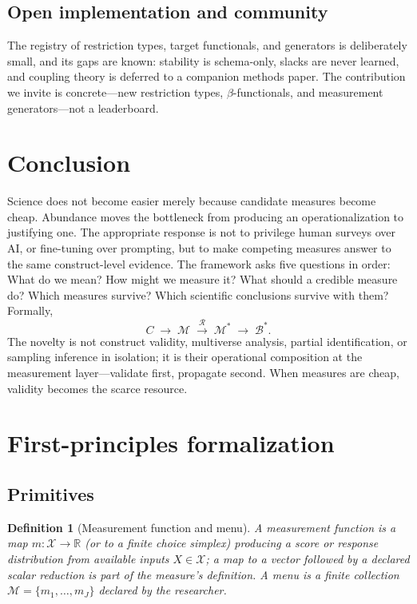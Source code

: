 \documentclass[10pt,letterpaper]{article}
\newtheorem{definition}{Definition}[section]
\newcommand{\M}{\ensuremath{\mathcal{M}}}
\newcommand{\Rset}{\mathcal{R}}
\newcommand{\Bset}{\mathcal{B}}
\begin{document}
\subsection{Open implementation and community}
The registry of restriction types, target functionals, and generators is deliberately small, and its gaps are known: stability is schema-only, slacks are never learned, and coupling theory is deferred to a companion methods paper.
The contribution we invite is concrete---new restriction types, $\beta$-functionals, and measurement generators---not a leaderboard.

\section{Conclusion}
\label{sec:conclusion}

Science does not become easier merely because candidate measures become cheap.
Abundance moves the bottleneck from producing an operationalization to justifying one.
The appropriate response is not to privilege human surveys over AI, or fine-tuning over prompting, but to make competing measures answer to the same construct-level evidence.
The framework asks five questions in order: What do we mean?
How might we measure it?
What should a credible measure do?
Which measures survive?
Which scientific conclusions survive with them?
Formally,
\[
C\;\longrightarrow\;\M\;\xrightarrow{\;\Rset\;}\;\M^*\;\longrightarrow\;\Bset^*.
\]
The novelty is not construct validity, multiverse analysis, partial identification, or sampling inference in isolation; it is their operational composition at the measurement layer---validate first, propagate second.
When measures are cheap, validity becomes the scarce resource.

\clearpage
\appendix

\section{First-principles formalization}
\label{app:formal}

\subsection{Primitives}
\begin{definition}[Measurement function and menu]
A \emph{measurement function} is a map $m:\mathcal{X}\to\mathbb{R}$ (or to a finite choice simplex) producing a score or response distribution from available inputs $X\in\mathcal{X}$; a map to a vector followed by a \emph{declared} scalar reduction is part of the measure's definition.
A \emph{menu} is a finite collection $\M=\{m_1,\ldots,m_J\}$ declared by the researcher.
\end{definition}
\end{document}
